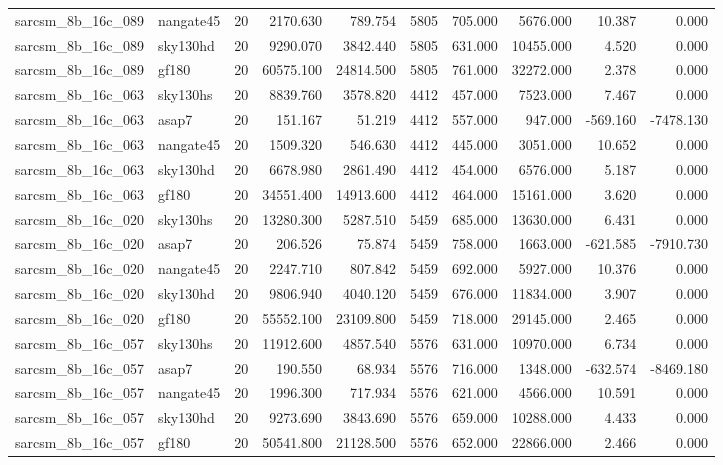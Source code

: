 \begin{tabular}{llrrrrrrrr}
sarcsm\_8b\_16c\_089 & nangate45 & 20 & 2170.630 & 789.754 & 5805 & 705.000 & 5676.000 & 10.387 & 0.000 \\
sarcsm\_8b\_16c\_089 & sky130hd & 20 & 9290.070 & 3842.440 & 5805 & 631.000 & 10455.000 & 4.520 & 0.000 \\
sarcsm\_8b\_16c\_089 & gf180 & 20 & 60575.100 & 24814.500 & 5805 & 761.000 & 32272.000 & 2.378 & 0.000 \\
sarcsm\_8b\_16c\_063 & sky130hs & 20 & 8839.760 & 3578.820 & 4412 & 457.000 & 7523.000 & 7.467 & 0.000 \\
sarcsm\_8b\_16c\_063 & asap7 & 20 & 151.167 & 51.219 & 4412 & 557.000 & 947.000 & -569.160 & -7478.130 \\
sarcsm\_8b\_16c\_063 & nangate45 & 20 & 1509.320 & 546.630 & 4412 & 445.000 & 3051.000 & 10.652 & 0.000 \\
sarcsm\_8b\_16c\_063 & sky130hd & 20 & 6678.980 & 2861.490 & 4412 & 454.000 & 6576.000 & 5.187 & 0.000 \\
sarcsm\_8b\_16c\_063 & gf180 & 20 & 34551.400 & 14913.600 & 4412 & 464.000 & 15161.000 & 3.620 & 0.000 \\
sarcsm\_8b\_16c\_020 & sky130hs & 20 & 13280.300 & 5287.510 & 5459 & 685.000 & 13630.000 & 6.431 & 0.000 \\
sarcsm\_8b\_16c\_020 & asap7 & 20 & 206.526 & 75.874 & 5459 & 758.000 & 1663.000 & -621.585 & -7910.730 \\
sarcsm\_8b\_16c\_020 & nangate45 & 20 & 2247.710 & 807.842 & 5459 & 692.000 & 5927.000 & 10.376 & 0.000 \\
sarcsm\_8b\_16c\_020 & sky130hd & 20 & 9806.940 & 4040.120 & 5459 & 676.000 & 11834.000 & 3.907 & 0.000 \\
sarcsm\_8b\_16c\_020 & gf180 & 20 & 55552.100 & 23109.800 & 5459 & 718.000 & 29145.000 & 2.465 & 0.000 \\
sarcsm\_8b\_16c\_057 & sky130hs & 20 & 11912.600 & 4857.540 & 5576 & 631.000 & 10970.000 & 6.734 & 0.000 \\
sarcsm\_8b\_16c\_057 & asap7 & 20 & 190.550 & 68.934 & 5576 & 716.000 & 1348.000 & -632.574 & -8469.180 \\
sarcsm\_8b\_16c\_057 & nangate45 & 20 & 1996.300 & 717.934 & 5576 & 621.000 & 4566.000 & 10.591 & 0.000 \\
sarcsm\_8b\_16c\_057 & sky130hd & 20 & 9273.690 & 3843.690 & 5576 & 659.000 & 10288.000 & 4.433 & 0.000 \\
sarcsm\_8b\_16c\_057 & gf180 & 20 & 50541.800 & 21128.500 & 5576 & 652.000 & 22866.000 & 2.466 & 0.000 \\

\end{tabular}
